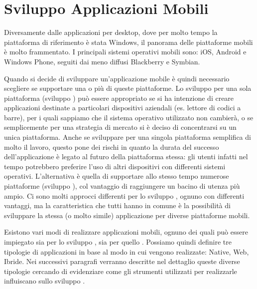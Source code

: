 \chapter{Sviluppo Applicazioni Mobili}
\label{chap:sam}
    Diversamente dalle applicazioni per desktop, dove per molto tempo la
    piattaforma di riferimento è stata Windows, il panorama delle piattaforme
    mobili è molto frammentato. I principali sistemi operativi mobili sono: iOS,
    Android e Windows Phone, seguiti dai meno diffusi Blackberry e Symbian.

    Quando si decide di sviluppare un'applicazione mobile è quindi necessario
    scegliere se supportare una o più di queste piattaforme. Lo sviluppo per
    una sola piattaforma (sviluppo \singleplat{}) può essere appropriato se si ha
    intenzione di creare applicazioni destinate a particolari dispositivi
    aziendali (es. lettore di codici a barre), per i quali sappiamo che il
    sistema operativo utilizzato non cambierà, o se semplicemente per una
    strategia di mercato si è deciso di concentrarsi su un unica piattaforma.
    Anche se sviluppare per una singola piattaforma semplifica di
    molto il lavoro, questo pone dei rischi in quanto la durata del successo
    dell'applicazione è legato al futuro della piattaforma stessa: gli utenti
    infatti nel tempo potrebbero preferire l'uso di altri dispositivi con
    differenti sistemi operativi.
    L'alternativa è quella di supportare allo stesso tempo numerose piattaforme
    (sviluppo \crossplat{}), col vantaggio di raggiungere un bacino di utenza
    più ampio.
    Ci sono molti approcci differenti per lo sviluppo \crossplat{}, ognuno con
    differenti vantaggi, ma la caratteristica che tutti hanno in comune è la
    possibilità di sviluppare la stessa (o molto simile) applicazione per
    diverse piattaforme mobili.

    Esistono vari modi di realizzare applicazioni mobili, ognuno dei quali può
    essere impiegato sia per lo sviluppo \singleplat{}, sia per quello
    \crossplat{}.
    Possiamo quindi definire tre tipologie di applicazioni in base al modo in
    cui vengono realizzate: Native, Web, Ibride.
    Nei successivi paragrafi verranno descritte nel dettaglio queste diverse
    tipologie cercando di evidenziare come gli strumenti utilizzati per
    realizzarle influiscano sullo sviluppo \crossplat{}.

